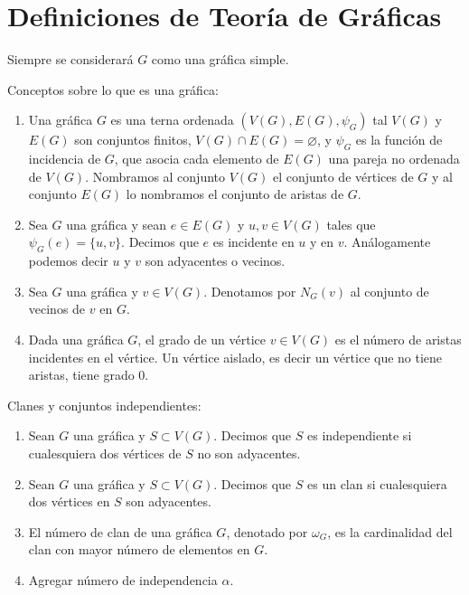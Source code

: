 \chapter{Definiciones de Teor\'ia de Gr\'aficas}%
\label{cap:defs grafs}


Siempre se considerar\'a $G$ como una gr\'afica simple.

\begin{definicion} Conceptos sobre lo que es una gr\'afica:
    \label{def:grafica}
    \begin{enumerate}
        \item Una gr\'afica $G$ es una terna ordenada $(V(G), E(G), \psi_G)$ tal
        $V(G)$ y $E(G)$ son conjuntos finitos, $V(G) \cap E(G) = \varnothing$, y
        $\psi_G$ es la funci\'on de incidencia de $G$, que asocia cada elemento
        de $E(G)$ una pareja no ordenada de $V(G)$. Nombramos al conjunto $V(G)$
        el conjunto de v\'ertices de $G$ y al conjunto $E(G)$ lo nombramos el
        conjunto de aristas de $G$.
        \item Sea $G$ una gr\'afica y sean $e \in E(G)$ y $u,v \in V(G)$ tales
        que $\psi_G(e)= \{u, v\}$. Decimos que $e$ es incidente en $u$ y en $v$.
        An\'alogamente podemos decir $u$ y $v$ son adyacentes o vecinos.
        \item Sea $G$ una gr\'afica y $v\in V(G)$. Denotamos por $N_G(v)$ al
        conjunto de vecinos de $v$ en $G$.
        \item Dada una gr\'afica $G$, el grado de un v\'ertice $v \in V(G)$ es
        el n\'umero de aristas incidentes en el v\'ertice. Un v\'ertice aislado,
        es decir un v\'ertice que no tiene aristas, tiene grado 0.
    \end{enumerate}
\end{definicion}

\begin{definicion} Clanes y conjuntos independientes:
    \label{def:clanes y conjunto independiente}
    \begin{enumerate}
        \item Sean $G$ una gr\'afica y $S \subset V(G)$. Decimos que $S$ es
        independiente si cualesquiera dos v\'ertices de $S$ no son adyacentes.
        \item Sean $G$ una gr\'afica y $S \subset V(G)$. Decimos que $S$ es un
        clan si cualesquiera dos v\'ertices en $S$ son adyacentes.
        \item El n\'umero de clan de una gr\'afica $G$, denotado por $\omega_G$,
        es la cardinalidad del clan con mayor n\'umero de elementos en $G$.
        \item Agregar n\'umero de independencia $\alpha$.
    \end{enumerate}
\end{definicion}

